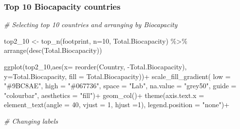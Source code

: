 \documentclass[
]{article}
\newenvironment{Shaded}{\begin{snugshade}}{\end{snugshade}}
\newcommand{\AttributeTok}[1]{\textcolor[rgb]{0.77,0.63,0.00}{#1}}
\newcommand{\CommentTok}[1]{\textcolor[rgb]{0.56,0.35,0.01}{\textit{#1}}}
\newcommand{\DecValTok}[1]{\textcolor[rgb]{0.00,0.00,0.81}{#1}}
\newcommand{\FunctionTok}[1]{\textcolor[rgb]{0.00,0.00,0.00}{#1}}
\newcommand{\NormalTok}[1]{#1}
\newcommand{\OtherTok}[1]{\textcolor[rgb]{0.56,0.35,0.01}{#1}}
\newcommand{\SpecialCharTok}[1]{\textcolor[rgb]{0.00,0.00,0.00}{#1}}
\newcommand{\StringTok}[1]{\textcolor[rgb]{0.31,0.60,0.02}{#1}}
\begin{document}
\hypertarget{top-10-biocapacity-countries}{%
\subsubsection{Top 10 Biocapacity
countries}\label{top-10-biocapacity-countries}}

\begin{Shaded}
\begin{Highlighting}[]
\CommentTok{\# Selecting top 10 countries and arranging by Biocapacity}

\NormalTok{top2\_10 }\OtherTok{\textless{}{-}} \FunctionTok{top\_n}\NormalTok{(footprint, }\AttributeTok{n=}\DecValTok{10}\NormalTok{, Total.Biocapacity) }\SpecialCharTok{\%\textgreater{}\%} 
  \FunctionTok{arrange}\NormalTok{(}\FunctionTok{desc}\NormalTok{(Total.Biocapacity))}

\FunctionTok{ggplot}\NormalTok{(top2\_10,}\FunctionTok{aes}\NormalTok{(}\AttributeTok{x=} \FunctionTok{reorder}\NormalTok{(Country, }\SpecialCharTok{{-}}\NormalTok{Total.Biocapacity), }\AttributeTok{y=}\NormalTok{Total.Biocapacity, }\AttributeTok{fill =}\NormalTok{ Total.Biocapacity))}\SpecialCharTok{+}
  \FunctionTok{scale\_fill\_gradient}\NormalTok{(}
    \AttributeTok{low =} \StringTok{"\#9BC8AE"}\NormalTok{,}
    \AttributeTok{high =} \StringTok{"\#067736"}\NormalTok{,}
    \AttributeTok{space =} \StringTok{"Lab"}\NormalTok{,}
    \AttributeTok{na.value =} \StringTok{"grey50"}\NormalTok{,}
    \AttributeTok{guide =} \StringTok{"colourbar"}\NormalTok{,}
    \AttributeTok{aesthetics =} \StringTok{"fill"}\NormalTok{)}\SpecialCharTok{+} 
  \FunctionTok{geom\_col}\NormalTok{()}\SpecialCharTok{+}
  \FunctionTok{theme}\NormalTok{(}\AttributeTok{axis.text.x =} \FunctionTok{element\_text}\NormalTok{(}\AttributeTok{angle =} \DecValTok{40}\NormalTok{, }\AttributeTok{vjust =} \DecValTok{1}\NormalTok{, }\AttributeTok{hjust =}\DecValTok{1}\NormalTok{),}
        \AttributeTok{legend.position =} \StringTok{"none"}\NormalTok{)}\SpecialCharTok{+}
  
  \CommentTok{\# Changing labels}
  

\end{Highlighting}
\end{Shaded}
\end{document}
